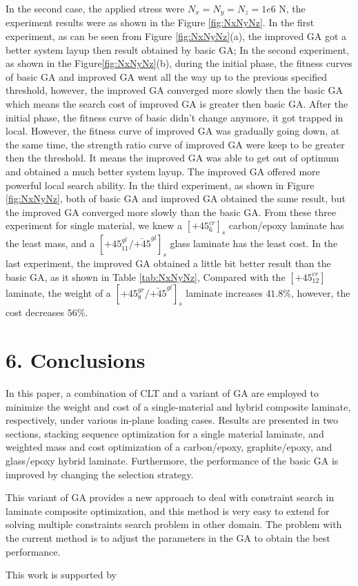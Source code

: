 \documentclass[Afour,sagev,times]{sagej}
\begin{document}
In the second case, the applied stress were $N_x=N_y=N_z=1e6$ N, the experiment results were as
shown in the Figure \ref{fig:NxNyNz}. In the first experiment, as can be seen from Figure \ref{fig:NxNyNz}(a), the improved GA got a
better system layup then result obtained by basic GA; In the second experiment, as shown in the Figure\ref{fig:NxNyNz}(b), during
the initial phase, the fitness curves of basic GA and improved GA went all the way up to the
previous specified threshold, however, the improved GA converged more slowly then the basic GA which
means the search cost of improved GA is greater then basic GA. After the initial phase, the fitness
curve of basic didn't change anymore, it got trapped in local.  However, the fitness curve of
improved GA was gradually going down, at the same time,  the strength ratio curve of improved GA
were keep to be greater then the threshold. It means the improved GA was able to get out of optimum
and obtained a much better system layup.  The improved GA offered more powerful local search
ability. In the third experiment, as shown in Figure \ref{fig:NxNyNz}, both of basic GA and improved
GA obtained the same result, but the improved GA converged more slowly than the basic GA. From these
three experiment for single material, we knew a $[\text{+}45_{6}^{cr}]_s$ carbon/epoxy laminate has
the least mass, and a $[\text{+}45_{11}^{gl}/\bar{\text{+}45}^{gl}]_s$ glass laminate has the least
cost. In the last experiment, the improved GA obtained a little bit better result than the basic GA,
as it shown in Table \ref{tab:NxNyNz}, Compared with the $[\text{+}45_{12}^{cr}]$ laminate, the
weight of a $[\text{+}45_8^{gr}/\bar{\text{+}45}^{gl}]_s$ laminate increases $41.8\%$, however, the
cost decreases $56\%$.

\section{6. Conclusions}
In this paper, a combination of CLT and a variant of GA are employed to minimize the weight and cost
of a single-material and hybrid composite laminate, respectively, under various in-plane loading
cases.  Results are presented in two sections, stacking sequence optimization for a single material
laminate, and weighted  mass and cost optimization of a carbon/epoxy, graphite/epoxy, and
glass/epoxy hybrid laminate.  Furthermore, the performance of the basic GA is improved by changing the
selection strategy.

This variant of GA provides a new approach to deal with constraint search in laminate composite
optimization, and this method is very easy to extend for solving multiple constraints search problem in other
domain. The problem with the current method is to adjust the parameters in the GA to obtain the best
performance. 



\begin{acks}
	This work is supported by
\end{acks}



\end{document}
